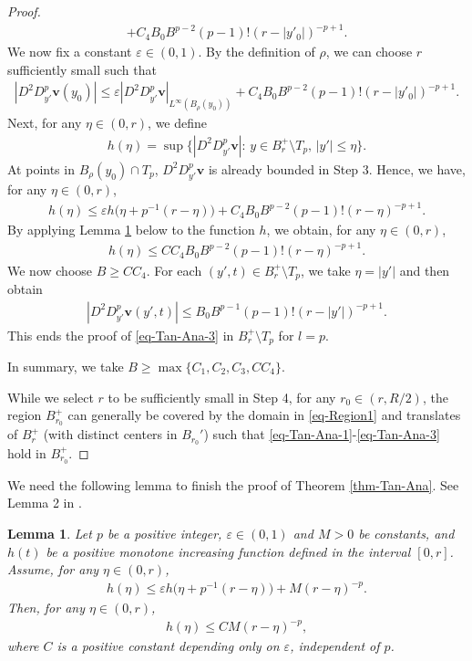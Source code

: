 \documentclass[11pt,reqno]{amsart}
\renewcommand{\leq}{\leqslant}
\renewcommand{\geq}{\geqslant}
\newtheorem{lemma}[theorem]{Lemma}
\theoremstyle{definition}
\numberwithin{equation}{section}
\begin{document}
\begin{proof}
\begin{align}
+C_4 B_0B^{p-2}(p-1)!(r-|y'_0|)^{-p+1}.\end{align}
We now fix a constant $\varepsilon\in (0,1)$. 
By the definition of $\rho$, we can choose $r$ sufficiently small such that
\begin{align}|D^2D_{y'}^{p}\mathbf v(y_0)|\leq \varepsilon|D^2D_{y'}^{p}\mathbf v|_{L^\infty(B_\rho(y_0))}
+C_4 B_0B^{p-2}(p-1)!(r-|y'_0|)^{-p+1}.\end{align}
Next, for any $\eta\in (0,r)$, we define 
\begin{align}h(\eta)=\sup\{|D^2D_{y'}^{p}\mathbf v|:\, y\in B^+_r\setminus T_p,\,  |y'|\leq \eta\}.\end{align}
At points in $B_{\rho}(y_0)\cap T_p$, $D^2 D^{p}_{y'}\mathbf v$ is already bounded in Step 3. 
Hence, we have, for any $\eta\in (0,r)$,  
\begin{align}
h(\eta) \leq \varepsilon h\big(\eta+p^{-1}(r-\eta)\big)+C_4 B_0B^{p-2}(p-1)!(r-\eta)^{-p+1}.
\end{align}
By applying Lemma \ref{lemma-LinearAnalyticity-Iteration} below to the function $h$, we obtain, 
for any $\eta\in (0,r)$, 
\begin{align}h(\eta)\leq CC_4 B_0B^{p-2}(p-1)!(r-\eta)^{-p+1}.\end{align}
We now choose $B\geq  CC_4$. For each $(y',t)\in B^+_r\setminus T_p$, we take 
$\eta=|y'|$ and then obtain 
\begin{align}|D^2D_{y'}^{p}\mathbf v(y',t)|\leq B_0B^{p-1}(p-1)!(r-|y'|)^{-p+1}.\end{align}
This ends the proof of \eqref{eq-Tan-Ana-3} in $B^+_r\setminus T_p$ for $l=p$. 

In summary, we take $B\geq  \max\{C_1, C_2, C_3, CC_4\}$. 

While we select $r$ to be sufficiently small in Step 4, for any $r_0 \in (r, R/2)$, the region $B^+_{r_0}$ can generally be covered by the domain in \eqref{eq-Region1} and translates of $B^+_r$ (with distinct centers in $B_{r_0}'$) such that \eqref{eq-Tan-Ana-1}-\eqref{eq-Tan-Ana-3} hold in $B^+_{r_0}$.
\end{proof}

We need the following lemma to finish the proof of Theorem \ref{thm-Tan-Ana}. See Lemma 2 in \cite{Friedman1958}. 

\begin{lemma}\label{lemma-LinearAnalyticity-Iteration}
Let $p$ be a positive integer, 
$\varepsilon\in (0,1)$ and $M>0$ be constants, 
and $h(t)$ be a positive monotone increasing function defined in the interval $[0,r]$. 
Assume, for any $\eta\in (0,r)$, 
\begin{align}
h(\eta) \leq \varepsilon h\big(\eta+p^{-1}(r-\eta)\big)+M(r-\eta)^{-p}.
\end{align}
Then, for any $\eta\in (0,r)$, 
\begin{align}h(\eta)\leq CM(r-\eta)^{-p},\end{align} 
where $C$ is a positive constant depending only on $\varepsilon$, independent of $p$.
\end{lemma}
\end{document}
